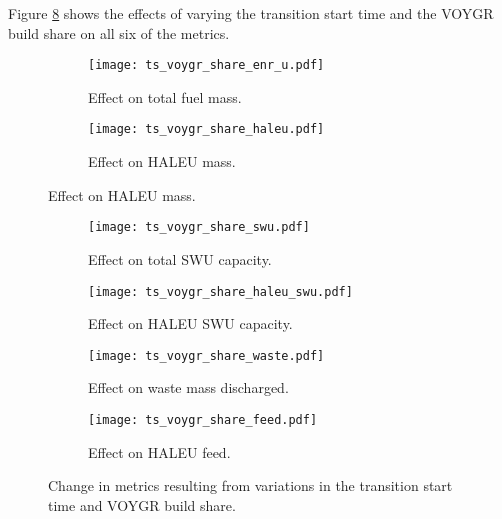 Figure \ref{fig:ts_voygr_share} shows the effects of varying the 
transition start time and the VOYGR build share on all six of the 
metrics. 

\begin{figure}
    \begin{subfigure}[t]{0.48\textwidth}
        \centering
        \texttt{[image: ts\_voygr\_share\_enr\_u.pdf]}
        \caption{Effect on total fuel mass.}
        \label{fig:ts_voygr_share_enr_u}
    \end{subfigure}
    \hfill
    \begin{subfigure}[t]{0.48\textwidth}
        \centering
        \texttt{[image: ts\_voygr\_share\_haleu.pdf]}
        \caption{Effect on HALEU mass.}
        \label{fig:ts_voygr_share_haleu}
    \end{subfigure}
\end{figure}

\begin{figure}
    \ContinuedFloat
    \begin{subfigure}[t]{0.48\textwidth}
        \centering
        \texttt{[image: ts\_voygr\_share\_swu.pdf]}
        \caption{Effect on total SWU capacity.}
        \label{fig:ts_voygr_share_swu}
    \end{subfigure}
    \hfill
    \begin{subfigure}[t]{0.48\textwidth}
        \centering
        \texttt{[image: ts\_voygr\_share\_haleu\_swu.pdf]}
        \caption{Effect on HALEU SWU capacity.}
        \label{fig:ts_voygr_share_haleu_swu}
    \end{subfigure}
    
    \begin{subfigure}[t]{0.48\textwidth}
        \centering
        \texttt{[image: ts\_voygr\_share\_waste.pdf]}
        \caption{Effect on waste mass discharged.}
        \label{fig:ts_voygr_share_waste}
    \end{subfigure}
    \hfill
    \begin{subfigure}[t]{0.48\textwidth}
        \centering
        \texttt{[image: ts\_voygr\_share\_feed.pdf]}
        \caption{Effect on HALEU feed.}
        \label{fig:ts_voygr_share_feed}
    \end{subfigure}
    \caption{Change in metrics resulting from variations in the 
    transition start time and VOYGR build share.}
    \label{fig:ts_voygr_share}
\end{figure}

